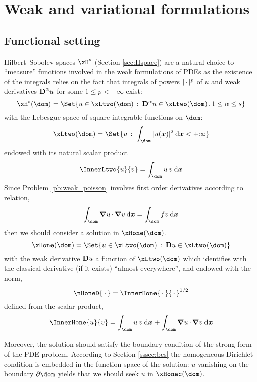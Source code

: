 \section{Weak and variational formulations}\label{sec:weak_forms}

\subsection{Functional setting}

Hilbert--Sobolev spaces $\xH^s$ (Section \ref{sec:Hspace}) are a natural choice to ``measure'' functions involved in the weak formulations of PDEs as the existence of the integrals relies on the fact that integrals of powers $|\,{\mathbf\cdot}\,|^p$ of $u$ and weak derivatives ${\boldsymbol{\mathrm D}}^\alpha u$ for some $1 \leq p < +\infty$ exist:
\begin{equation*}
\xH^s(\dom) = \Set{ u \in \xLtwo(\dom)\,:\: \D^\alpha u \in \xLtwo(\dom)\,, 1 \leq \alpha \leq s }
\end{equation*}
with the Lebesgue space of square integrable functions on $\dom$:
\begin{equation*}
\xLtwo(\dom) = \Set{ u\,:\; \int_\dom |u(\xx)|^2 \dxx < +\infty  }
\end{equation*}
endowed with its natural scalar product
\begin{equation*}
\InnerLtwo{u}{v} = \int_\dom u\: v\dxx
\end{equation*}
Since Problem \eqref{pb:weak_poisson} involves first order derivatives according to relation,
\begin{equation*}
\int_\dom \Grad u\xDot \Grad v\dxx = \int_\dom f v  \dxx
\end{equation*}
then we should consider a solution in $\xHone(\dom)$.
\begin{equation*}
\xHone(\dom) = \Set{ u \in \xLtwo(\dom)\,:\: \D u \in \xLtwo(\dom) }
\end{equation*}
with the weak derivative ${\boldsymbol{\mathrm D}} u$ \ie a function of $\xLtwo(\dom)$ which identifies with the classical derivative (if it exists) ``almost everywhere'', and endowed with the norm,
\begin{equation*}
\nHoneD{\xDot} = \InnerHone{\xDot}{\xDot}^{1/2}
\end{equation*}
defined from the scalar product,
\begin{equation*}
\InnerHone{u}{v} = \int_\dom u\: v\dxx + \int_\dom \Grad u\xDot \Grad v\dxx
\end{equation*}

\medskip
Moreover, the solution should satisfy the boundary condition of the strong form of the PDE problem. According to Section \ref{sssec:bcs} the homogeneous Dirichlet condition is embedded in the function space of the solution: $u$ vanishing on the boundary $\partial \dom$ yields that we should seek $u$ in $\xHonec(\dom)$.

